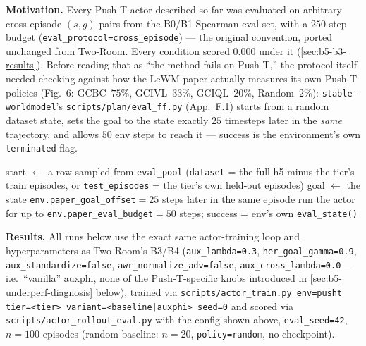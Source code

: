 \documentclass[11pt]{article}
\begin{document}
\textbf{Motivation.} Every Push-T actor described so far was evaluated on arbitrary
cross-episode $(s,g)$ pairs from the B0/B1 Spearman eval set, with a $250$-step budget
(\texttt{eval\_protocol=cross\_episode}) --- the original convention, ported unchanged from
Two-Room. Every condition scored $0.000$ under it (\cref{sec:b5-b3-results}). Before reading
that as ``the method fails on Push-T,'' the protocol itself needed checking against how the
LeWM paper actually measures its own Push-T policies (Fig.~6: GCBC~$75\%$, GCIVL~$33\%$,
GCIQL~$20\%$, Random~$2\%$): \texttt{stable-worldmodel}'s \texttt{scripts/plan/eval\_ff.py}
(App.~F.1) starts from a random dataset state, sets the goal to the state exactly $25$
timesteps later in the \emph{same} trajectory, and allows $50$ env steps to reach it ---
success is the environment's own \texttt{terminated} flag.

\begin{algorithm}[H]
\caption{\texttt{eval\_protocol=same\_episode} (\texttt{config/graph/actor.yaml}, now default)}
\begin{algorithmic}[1]
\State start $\gets$ a row sampled from \texttt{eval\_pool} (\texttt{dataset} = the full h5
minus the tier's train episodes, or \texttt{test\_episodes} = the tier's own held-out episodes)
\State goal $\gets$ the state \texttt{env.paper\_goal\_offset}$=25$ steps later in the same episode
\State run the actor for up to \texttt{env.paper\_eval\_budget}$=50$ steps; success = env's own \texttt{eval\_state()}
\end{algorithmic}
\end{algorithm}

\textbf{Results.} All runs below use the exact same actor-training loop and hyperparameters as
Two-Room's B3/B4 (\texttt{aux\_lambda=0.3}, \texttt{her\_goal\_gamma=0.9},
\texttt{aux\_standardize=false}, \texttt{awr\_normalize\_adv=false}, \texttt{aux\_cross\_lambda=0.0}
--- i.e.\ ``vanilla'' auxphi, none of the Push-T-specific knobs introduced in
\cref{sec:b5-underperf-diagnosis} below), trained via \texttt{scripts/actor\_train.py env=pusht
tier=<tier> variant=<baseline|auxphi> seed=0} and scored via
\texttt{scripts/actor\_rollout\_eval.py} with the config shown above, \texttt{eval\_seed=42},
$n=100$ episodes (random baseline: $n=20$, \texttt{policy=random}, no checkpoint).
\end{document}
